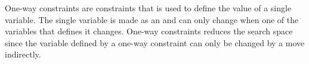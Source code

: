One-way constraints are constraints that is used to define the value of a single variable. The single variable is made 
as an  and can only change when one of the variables that defines it changes. One-way 
constraints reduces the search space  since the variable defined 
by a one-way constraint can only be changed by a move indirectly. 